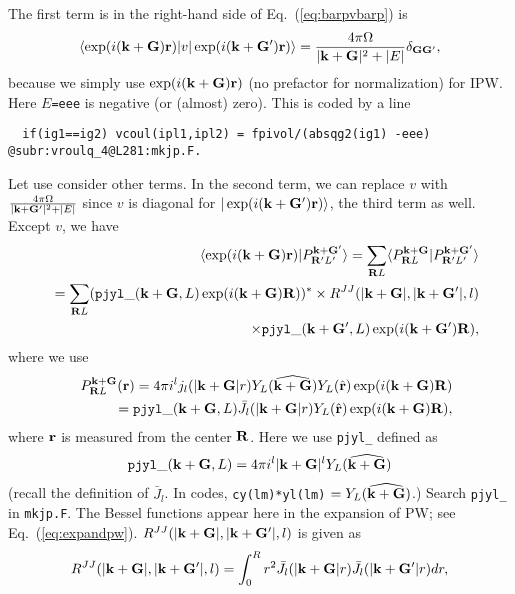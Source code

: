 \documentclass[a4paper,10pt,epsf,fleqn]{article}
\newcommand{\bfk}{{\bf k}}
\newcommand{\bfr}{{\bf r}}
\newcommand{\bfG}{{\bf G}}
\newcommand{\bfR}{{\bf R}}
\newcommand{\req}[1]{\mbox{Eq.~(\ref{#1})}}
\begin{document}
The first term is in the right-hand side of \req{eq:barpvbarp} is
\begin{eqnarray}
\langle \exp(i(\bfk+\bfG)\bfr) |v| \exp(i(\bfk+\bfG')\bfr) \rangle
=\frac{4 \pi \Omega}{|\bfk+\bfG|^2+|E|} \delta_{\bfG\bfG'},
\label{eq:barpvbarp1st}
\end{eqnarray}
because we simply use $\exp(i(\bfk+\bfG)\bfr)$ 
(no prefactor for normalization) for IPW. 
Here $E$\verb!=eee! is negative (or (almost) zero). 
This is coded by a line 
\begin{verbatim}
  if(ig1==ig2) vcoul(ipl1,ipl2) = fpivol/(absqg2(ig1) -eee)
@subr:vroulq_4@L281:mkjp.F.
\end{verbatim}

Let use consider other terms. In the second term,
we can replace $v$ with $\frac{4 \pi \Omega}{|\bfk+\bfG'|^2+|E|}$
since $v$ is diagonal for $|\exp(i(\bfk+\bfG')\bfr) \rangle$, the third term as well. Except $v$, 
we have
\begin{eqnarray}
&&\langle \exp(i(\bfk+\bfG)\bfr)| P^{\bfk+\bfG'}_{\bfR'{L'}}\rangle
=\sum_{\bfR{L}} \langle 
P^{\bfk+\bfG}_{\bfR{L}}|
P^{\bfk+\bfG'}_{\bfR'{L'}}\rangle \nonumber \\
&&=\sum_{\bfR{L}} 
({\tt pjyl\_}(\bfk+\bfG,L) \exp(i(\bfk+\bfG)\bfR))^* 
\times R^{JJ}(|\bfk+\bfG|,|\bfk+\bfG'|,l) \nonumber \\
&&\times {\tt pjyl\_}(\bfk+\bfG',L) \exp(i(\bfk+\bfG')\bfR), \label{eq:fourvp0}
\end{eqnarray}
where we use 
\begin{eqnarray}
&&P^{\bfk+\bfG}_{\bfR{L}}(\bfr)=4 \pi i^l j_l(|{\bfk+\bfG}|r) 
Y_L(\widehat{\bfk+\bfG}) Y_L(\hat{\bfr})\exp(i(\bfk+\bfG)\bfR)\nonumber \\
&&= {\tt pjyl\_}(\bfk+\bfG,L) \bar{J}_l(|{\bfk+\bfG}|r) Y_L(\hat{\bfr})
\exp(i(\bfk+\bfG)\bfR), 
\end{eqnarray}
where $\bfr$ is measured from the center $\bfR$.
Here we use {\tt pjyl\_} defined as
\begin{eqnarray}
{\tt pjyl\_}(\bfk+\bfG,L) 
=4 \pi i^l |\bfk+\bfG|^l Y_L(\widehat{\bfk+\bfG}) \end{eqnarray}
(recall the definition of $\bar{J}_l$.
In codes, {\tt cy(lm)*yl(lm)}
$=Y_L(\widehat{\bfk+\bfG})$.)
Search {\tt pjyl\_} in {\tt mkjp.F}.
The Bessel functions appear here in the expansion of PW; see \req{eq:expandpw}.
$R^{JJ}(|\bfk+\bfG|,|\bfk+\bfG'|,l)$
is given as
\begin{eqnarray}
R^{JJ}(|\bfk+\bfG|,|\bfk+\bfG'|,l)
= \int_0^R  r^2 \bar{J}_l(|{\bfk+\bfG}|r)
\bar{J}_l(|{\bfk+\bfG'}|r) dr ,
\end{eqnarray}
\end{document}
